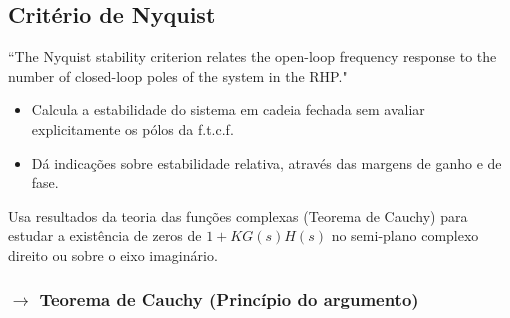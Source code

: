 \subsection[4.2 Critério de Nyquist]{\hspace*{0.075 em}\raisebox{0.2 em}{$\pmb{\drsh}$} Critério de Nyquist}

\noindent``The Nyquist stability criterion relates the open-loop frequency response to the number of closed-loop poles of the system in the RHP."\cite{FranklinPowell2015}

\vspace{1em}
\begin{itemize}
    \item Calcula a estabilidade do sistema em cadeia fechada sem avaliar explicitamente os pólos da f.t.c.f.
    \item Dá indicações sobre estabilidade relativa, através das margens de ganho e de fase.
\end{itemize}

\noindent Usa resultados da teoria das funções complexas (Teorema de Cauchy) para estudar a existência de zeros de $1+KG(s)H(s)$ no semi-plano complexo direito ou sobre o eixo imaginário.

\subsubsection[4.2.1 Teorema de Cauchy (Princípio do argumento)]{$\pmb{\rightarrow}$ Teorema de Cauchy (Princípio do argumento)}


